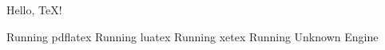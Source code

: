 \documentclass[english,parskip=half,12pt,a4paper]{scrartcl}
\begin{document}
Hello, \TeX!

\ifPDFTeX
  Running pdflatex
\else\ifLuaTeX
  Running luatex
\else\ifXeTeX
  Running xetex
\else
  Running Unknown Engine
\fi\fi\fi

\lipsum[2-4]

\lipsum[6-8]
\end{document}

